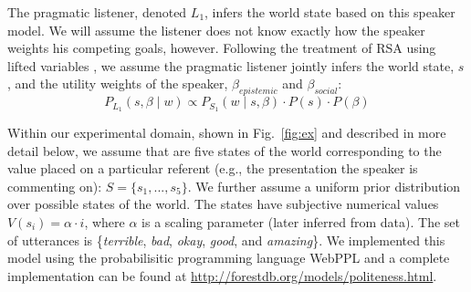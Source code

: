 \documentclass[10pt,letterpaper]{article}
\newcommand{\denote}[1]{\mbox{ $[\![ #1 ]\!]$}}
\newcommand{\mht}[1]{\textcolor{DarkOrange}{[mht: #1]}}
\newcommand{\ejy}[1]{\textcolor{Blue}{[ejy: #1]}}
\begin{document}
The pragmatic listener, denoted $L_1$, infers the world state based on this speaker model.
We will assume the listener does not know exactly how the speaker weights his competing goals, however.
Following the treatment of RSA using lifted variables \cite{GoodmanLassiter2015, bergen2016, Kao2014},
we assume the pragmatic listener jointly infers the world state, $s$, and the utility weights of the speaker, $\beta_{epistemic}$ and $\beta_{social}$:
\begin{equation}
P_{L_1}(s, \beta \mid w)\propto P_{S_1}(w \mid s, \beta)\cdot P(s) \cdot P(\beta) \label{eq:L1}
\end{equation}

%

Within our experimental domain, shown in Fig.~\ref{fig:ex} and described in more detail below, we assume that are five states of the world corresponding to the value placed on a particular referent (e.g., the presentation the speaker is commenting on): $S = \{s_{1}, ...,  s_{5}\}$.
We further assume a uniform prior distribution over possible states of the world.
The states have subjective numerical values $V(s_{i}) = \alpha \cdot i$, where $\alpha$ is a scaling parameter (later inferred from data).
The set of utterances is \{\emph{terrible}, \emph{bad}, \emph{okay}, \emph{good}, and \emph{amazing}\}.
We implemented this model using the probabilisitic programming language WebPPL \cite{dippl} and a complete implementation can be found at \url{http://forestdb.org/models/politeness.html}.
\end{document}
